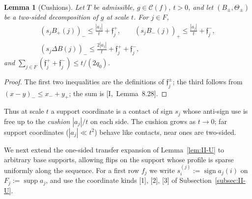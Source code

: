 \documentclass[10pt]{amsart}
\newtheorem{lemma}[theorem]{Lemma}
\theoremstyle{definition}
\theoremstyle{remark}
\newcommand{\supp}{\operatorname{supp}}
\newcommand{\sgn}{\operatorname{sign}}
\newcommand{\Cset}{\mathcal C}
\begin{document}
\begin{lemma}[Cushions]\label{lem:II-cushion}
Let $T$ be admissible, $g\in\Cset(f)$, $t>0$, and let $(B_\pm,\Theta_\pm)$
be a two-sided decomposition of $g$ at scale $t$.  For $j\in F$,
\begin{gather*}
 (s_jB_+(j))_-\le\frac{|a_j|}t+\mathfrak f^+_j,\qquad (s_jB_-(j))_+\le
 \frac{|a_j|}t+\mathfrak f^-_j,\\ (s_j\Delta B(j))_-\le\frac{2|a_j|}t+
 \mathfrak f^+_j+\mathfrak f^-_j,
\end{gather*}
and $\sum_{j\in F}(\mathfrak f^+_j+\mathfrak f^-_j)\le t/(2q_0)$.
\end{lemma}

\begin{proof}
The first two inequalities are the definitions of $\mathfrak f^\pm_j$; the
third follows from $(x-y)_-\le x_-+y_+$; the sum is [I,~Lemma~8.28].
\end{proof}

Thus at scale $t$ a support coordinate is a contact of sign $s_j$ whose
anti-sign use is free up to the \emph{cushion} $|a_j|/t$ on each side.  The
cushion grows as $t\to0$; far support coordinates ($|a_j|\ll t^2$) behave
like contacts, near ones are two-sided.

We next extend the one-sided transfer expansion of
Lemma~\ref{lem:II-U} to arbitrary base supports, allowing flips on the
support whose profile is sparse uniformly along the sequence.  For a first
row $f_j$ we write $s^{(j)}_i:=\sgn a_j(i)$ on $F_j:=\supp a_j$, and use the
coordinate kinds [1], [2], [3] of Subsection~\ref{subsec:II-U}.
\end{document}

